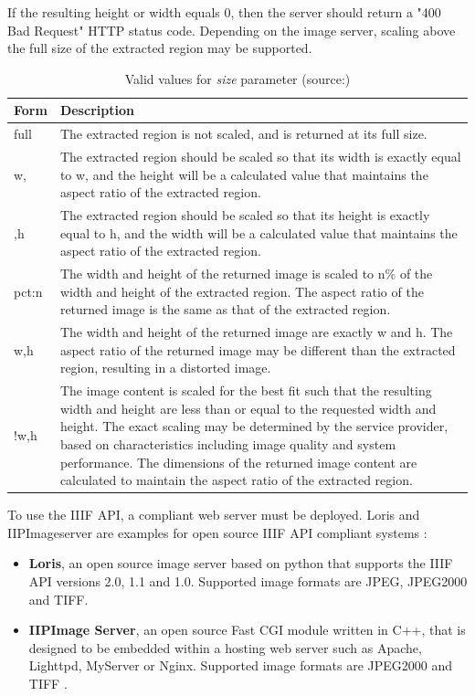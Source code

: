 If the resulting height or width equals 0, then the server should return a "400 Bad Request" HTTP status code. Depending on the image server, scaling above the full size of the extracted region may be supported\cite{web:iiif}.

\begin{table}[H]
	\begin{center}
		\begin{tabular}{| p{2cm} | p{9cm} |}
			\hline
			\textbf{Form} & \textbf{Description}\\ \hline
			full & The extracted region is not scaled, and is returned at its full size.\\ \hline
			w, & The extracted region should be scaled so that its width is exactly equal to w, and the height will be a calculated value that maintains the aspect ratio of the extracted region.\\ \hline
			,h & The extracted region should be scaled so that its height is exactly equal to h, and the width will be a calculated value that maintains the aspect ratio of the extracted region.\\ \hline
			pct:n & The width and height of the returned image is scaled to n\% of the width and height of the extracted region. The aspect ratio of the returned image is the same as that of the extracted region.\\ \hline
			w,h & The width and height of the returned image are exactly w and h. The aspect ratio of the returned image may be different than the extracted region, resulting in a distorted image.\\ \hline
			!w,h & The image content is scaled for the best fit such that the resulting width and height are less than or equal to the requested width and height. The exact scaling may be determined by the service provider, based on characteristics including image quality and system performance. The dimensions of the returned image content are calculated to maintain the aspect ratio of the extracted region.\\ \hline
		\end{tabular}
		\caption{Valid values for \emph{size} parameter (source:\cite{web:iiif})}
		\label{tab2_sizeParam}
	\end{center}
\end{table}

To use the IIIF API, a compliant web server must be deployed.
Loris and IIPImageserver are examples for open source IIIF API compliant systems \cite{web:openseadragon}:
\begin{itemize}
	\item \textbf{Loris}, an open source image server based on python that supports the IIIF API versions 2.0, 1.1 and 1.0. Supported image formats are JPEG, JPEG2000 and TIFF.
	\item \textbf{IIPImage Server}, an open source Fast CGI module written in C++, that is designed to be embedded within a hosting web server such as Apache, Lighttpd, MyServer or Nginx. Supported image formats are JPEG2000 and TIFF \cite{web:iiif2}.
\end{itemize}

